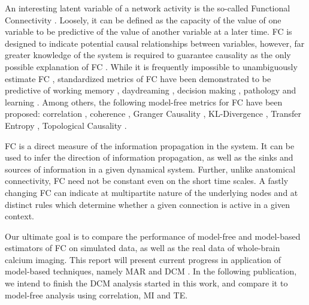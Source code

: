 \documentclass[a4paper,10pt]{article}
\begin{document}
An interesting latent variable of a network activity is the so-called Functional Connectivity \cite{friston_functional_2011, hutchison_dynamic_2013}. Loosely, it can be defined as the capacity of the value of one variable to be predictive of the value of another variable at a later time. FC is designed to indicate potential causal relationships between variables, however, far greater knowledge of the system is required to guarantee causality as the only possible explanation of FC \cite{wibral_directed_2014}. While it is frequently impossible to unambiguously estimate FC \cite{wibral_directed_2014}, standardized metrics of FC have been demonstrated to be predictive of working memory \cite{greicius_functional_2003, esposito_independent_2006}, daydreaming \cite{kucyi_dynamic_2014}, decision making \cite{lizier_multivariate_2010}, pathology \cite{sakoglu_classification_2009} and learning \cite{bassett_dynamic_2011}. Among others, the following model-free metrics for FC have been proposed: correlation \cite{greicius_persistent_2008, thompson_short_time_2012, viviani_resting_2011}, coherence \cite{pascual-marqui_isolated_2014}, Granger Causality \cite{zadeh_extension_1950, amblard_relation_2012, valdes_sosa_effective_2011, seth_granger_2015}, KL-Divergence \cite{amari_information_2001, nakahara_information-geometric_2002}, Transfer Entropy \cite{wibral_directed_2014, vicente_transfer_2010, nigam_rich-club_2016, lizier_differentiating_2010, lizier_multivariate_2010, ito_extending_2011, schreiber_measuring_2000}, Topological Causality \cite{harnack_topological_2017}.

FC is a direct measure of the information propagation in the system. It can be used to infer the direction of information propagation, as well as the sinks and sources of information in a given dynamical system. Further, unlike anatomical connectivity, FC need not be constant even on the short time scales. A fastly changing FC can indicate at multipartite nature of the underlying nodes and at distinct rules which determine whether a given connection is active in a given context.

Our ultimate goal is to compare the performance of model-free and model-based estimators of FC on simulated data, as well as the real data of whole-brain calcium imaging. This report will present current progress in application of model-based techniques, namely MAR \cite{penny_bayesian_2002} and DCM \cite{stephan_dynamic_2007, friston_functional_2011, frassle_regression_2017, jung_dynamic_2019}. In the following publication, we intend to finish the DCM analysis started in this work, and compare it to model-free analysis using correlation, MI and TE.
\end{document}

